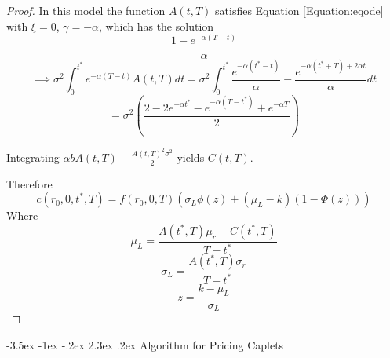 \documentclass[12pt]{article}
\makeatletter
\renewcommand\section{\@startsection{section}{1}{\z@}%
                                  {-3.5ex \@plus -1ex \@minus -.2ex}%
                                  {2.3ex \@plus.2ex}%
                                  {\normalfont\large\bfseries}}
\theoremstyle{definition}
\theoremstyle{remark}
\makeatother
\begin{document}
\begin{proof}
In this model the function \(A(t, T)\) satisfies Equation \ref{Equation:eqode} with \( \xi=0\), \(\gamma=-\alpha \), which has the solution 
\[\frac{1-e^{-\alpha (T-t)}}{\alpha}\]
\[\implies \sigma^2 \int _0^{{t^*}} e^{-\alpha (T-t)}A(t, T) dt=\sigma^2 \int _0^{{t^*}} \frac{e^{-\alpha({t^*}-t)}}{\alpha} -\frac{e^{-\alpha({t^*}+T)+2\alpha t}}{\alpha} dt \]
\[=\sigma^2\left(\frac{2-2e^{-\alpha {t^*}}-e^{-\alpha(T-{t^*})}+e^{-\alpha T} }{2} \right) \]

Integrating \(\alpha bA(t, T)- \frac{A(t, T)^2 \sigma^2}{2}\) yields \(C(t, T)\).

Therefore 
\[c(r_0, 0, t^*, T)=f(r_0, 0, T)\left( \sigma_L \phi(z)+  (\mu_L-k)(1-\Phi(z))  \right)\] 
Where
\[\mu_L= \frac{A({t^*}, T) \mu_r -C({t^*}, T)}{T-{t^*}}\]
\[\sigma_L= \frac{A({t^*}, T) \sigma_r}{T-{t^*}}\]
\[z=\frac{k-\mu_L}{\sigma_L}\]




\end{proof}

\section{Algorithm for Pricing Caplets}
\end{document}
